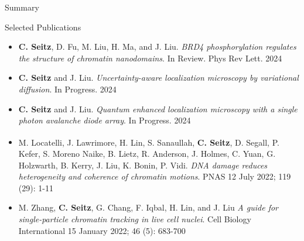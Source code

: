\documentclass{beamer}					%
\begin{document}
\begin{frame}{Summary}

\end{frame}

\begin{frame}{Selected Publications}

\begin{itemize}

\item \textbf{C. Seitz}, D. Fu, M. Liu, H. Ma, and J. Liu. \textit{BRD4 phosphorylation regulates the structure of chromatin nanodomains}. In Review. Phys Rev Lett. 2024

\item \textbf{C. Seitz} and J. Liu. \textit{Uncertainty-aware localization microscopy by variational diffusion}. In Progress. 2024

\item \textbf{C. Seitz} and J. Liu. \textit{Quantum enhanced localization microscopy with a single photon avalanche diode array}. In Progress. 2024

\item M. Locatelli\textsuperscript{\textdagger}, J. Lawrimore\textsuperscript{\textdagger}, H. Lin\textsuperscript{\textdagger}, S. Sanaullah, \textbf{C. Seitz}, D. Segall, P. Kefer, S. Moreno Naike, B. Lietz, R. Anderson, J. Holmes, C. Yuan, G. Holzwarth, B. Kerry, J. Liu, K. Bonin, P. Vidi. \textit{DNA damage reduces heterogeneity and coherence of chromatin motions}. PNAS 12 July 2022; 119 (29): 1-11

\item M. Zhang, \textbf{C. Seitz}, G. Chang, F. Iqbal, H. Lin, and J. Liu \textit{A guide for single-particle chromatin tracking in live cell nuclei}. Cell Biology International 15 January 2022; 46 (5): 683-700


\end{itemize}
\end{frame}
\end{document}
